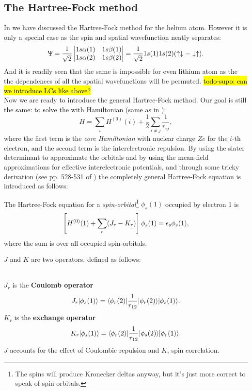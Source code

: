 \subsection{The Hartree-Fock method}
In  we have discussed the Hartree-Fock method for the helium atom. 
However it is only a special case as the spin and spatial wavefunction neatly 
separates:
\begin{equation}
\Uppsi=\frac{1}{\sqrt{2}}
\begin{vmatrix}
1s\alpha(1)&1s\beta(1)\\
1s\alpha(2)&1s\beta(2)
\end{vmatrix}
=\frac{1}{\sqrt{2}}1s(1)1s(2)(\uparrow\downarrow-\downarrow\uparrow).
\end{equation}
And it is readily seen that the same is impossible for even lithium atom as the the dependences of all the spatial wavefunctions will be permuted. \hl{todo-supo: can we introduce LCs like above?}\\
Now we are ready to introduce the general Hartree-Fock method. Our goal is still the same: to solve the \sch with Hamiltonian (same as in ):
\begin{equation}
H=\sum_i H^{(0)}(i)+\frac{1}{2}\sum_{i\neq j}\frac{1}{r_{ij}}, 
\end{equation}
where the first term is the \textit{core Hamiltonian} with nuclear charge $Ze$ for 
the $i$-th electron, and the second term is the interelectronic repulsion. 
By using the slater determinant to approximate the orbitals and by using the 
mean-field approximations for effective interelectronic potentials, and through 
some tricky derivation (see pp. 528-531 of \cite{atkinsqm}) the completely general 
Hartree-Fock equation is introduced as follows:
\begin{thrm}
The Hartree-Fock equation for a \textit{spin-orbital}\footnote{The spins will 
produce Kronecker deltas anyway, but it's just more correct to speak of 
spin-orbitals.} $\phi_s(1)$ occupied by electron 1 is 
\begin{equation}
\left[H^{(0)}(1)+\sum_r(J_r-K_r) \right]\phi_s(1)=\epsilon_s\phi_s(1),
\end{equation}
where the sum is over all occupied spin-orbitals. 
\end{thrm}
$J$ and $K$ are two operators, defined as follows:
\begin{defi}
\ \\
$J_r$ is the \textbf{Coulomb operator}
\begin{equation}
J_r|\phi_s(1)\rangle=\langle\phi_r(2)|\frac{1}{r_{12}}|\phi_r(2)\rangle|\phi_s(1)\rangle.
\end{equation}
$K_r$ is the \textbf{exchange operator}
\begin{equation}
K_r|\phi_s(1)\rangle=\langle\phi_r(2)|\frac{1}{r_{12}}|\phi_s(2)\rangle|\phi_r(1)\rangle.
\end{equation}
$J$ accounts for the effect of Coulombic repulsion and $K$, spin correlation. 
\end{defi}
